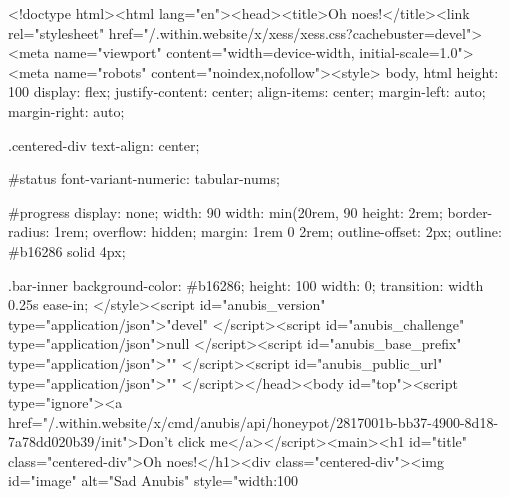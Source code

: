 <!doctype html><html lang="en"><head><title>Oh noes!</title><link rel="stylesheet" href="/.within.website/x/xess/xess.css?cachebuster=devel"><meta name="viewport" content="width=device-width, initial-scale=1.0"><meta name="robots" content="noindex,nofollow"><style>
        body,
        html {
            height: 100%
            display: flex;
            justify-content: center;
            align-items: center;
            margin-left: auto;
            margin-right: auto;
        }

        .centered-div {
            text-align: center;
        }

        #status {
            font-variant-numeric: tabular-nums;
        }

        #progress {
            display: none;
            width: 90%
            width: min(20rem, 90%
            height: 2rem;
            border-radius: 1rem;
            overflow: hidden;
            margin: 1rem 0 2rem;
            outline-offset: 2px;
            outline: #b16286 solid 4px;
        }

        .bar-inner {
            background-color: #b16286;
            height: 100%
            width: 0;
            transition: width 0.25s ease-in;
        }
    	</style><script id="anubis_version" type="application/json">"devel"
</script><script id="anubis_challenge" type="application/json">null
</script><script id="anubis_base_prefix" type="application/json">""
</script><script id="anubis_public_url" type="application/json">""
</script></head><body id="top"><script type="ignore"><a href="/.within.website/x/cmd/anubis/api/honeypot/2817001b-bb37-4900-8d18-7a78dd020b39/init">Don't click me</a></script><main><h1 id="title" class="centered-div">Oh noes!</h1><div class="centered-div"><img id="image" alt="Sad Anubis" style="width:100%